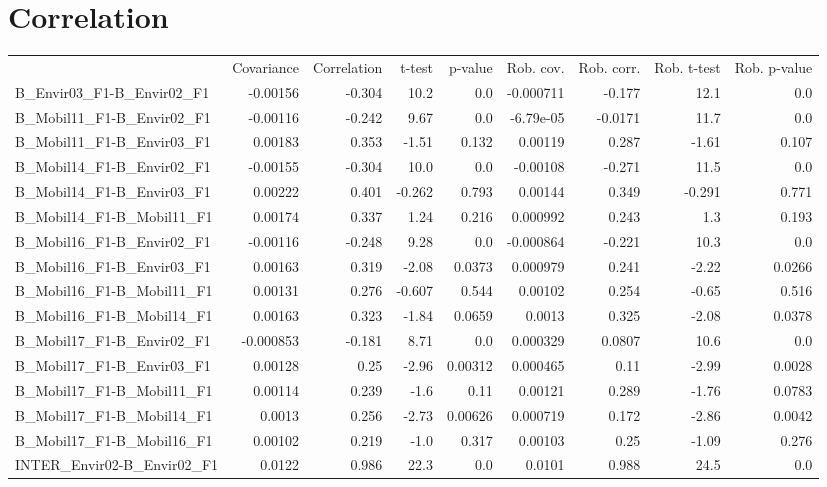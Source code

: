 \section{Correlation}
\begin{tabular}{lrrrrrrrr}
{} & {Covariance} & {Correlation} & {t-test} & {p-value} & {Rob. cov.} & {Rob. corr.} & {Rob. t-test} & {Rob. p-value} \\
B_Envir03_F1-B_Envir02_F1 & -0.00156 & -0.304 & 10.2 & 0.0 & -0.000711 & -0.177 & 12.1 & 0.0 \\
B_Mobil11_F1-B_Envir02_F1 & -0.00116 & -0.242 & 9.67 & 0.0 & -6.79e-05 & -0.0171 & 11.7 & 0.0 \\
B_Mobil11_F1-B_Envir03_F1 & 0.00183 & 0.353 & -1.51 & 0.132 & 0.00119 & 0.287 & -1.61 & 0.107 \\
B_Mobil14_F1-B_Envir02_F1 & -0.00155 & -0.304 & 10.0 & 0.0 & -0.00108 & -0.271 & 11.5 & 0.0 \\
B_Mobil14_F1-B_Envir03_F1 & 0.00222 & 0.401 & -0.262 & 0.793 & 0.00144 & 0.349 & -0.291 & 0.771 \\
B_Mobil14_F1-B_Mobil11_F1 & 0.00174 & 0.337 & 1.24 & 0.216 & 0.000992 & 0.243 & 1.3 & 0.193 \\
B_Mobil16_F1-B_Envir02_F1 & -0.00116 & -0.248 & 9.28 & 0.0 & -0.000864 & -0.221 & 10.3 & 0.0 \\
B_Mobil16_F1-B_Envir03_F1 & 0.00163 & 0.319 & -2.08 & 0.0373 & 0.000979 & 0.241 & -2.22 & 0.0266 \\
B_Mobil16_F1-B_Mobil11_F1 & 0.00131 & 0.276 & -0.607 & 0.544 & 0.00102 & 0.254 & -0.65 & 0.516 \\
B_Mobil16_F1-B_Mobil14_F1 & 0.00163 & 0.323 & -1.84 & 0.0659 & 0.0013 & 0.325 & -2.08 & 0.0378 \\
B_Mobil17_F1-B_Envir02_F1 & -0.000853 & -0.181 & 8.71 & 0.0 & 0.000329 & 0.0807 & 10.6 & 0.0 \\
B_Mobil17_F1-B_Envir03_F1 & 0.00128 & 0.25 & -2.96 & 0.00312 & 0.000465 & 0.11 & -2.99 & 0.0028 \\
B_Mobil17_F1-B_Mobil11_F1 & 0.00114 & 0.239 & -1.6 & 0.11 & 0.00121 & 0.289 & -1.76 & 0.0783 \\
B_Mobil17_F1-B_Mobil14_F1 & 0.0013 & 0.256 & -2.73 & 0.00626 & 0.000719 & 0.172 & -2.86 & 0.0042 \\
B_Mobil17_F1-B_Mobil16_F1 & 0.00102 & 0.219 & -1.0 & 0.317 & 0.00103 & 0.25 & -1.09 & 0.276 \\
INTER_Envir02-B_Envir02_F1 & 0.0122 & 0.986 & 22.3 & 0.0 & 0.0101 & 0.988 & 24.5 & 0.0 \\

\end{tabular}
